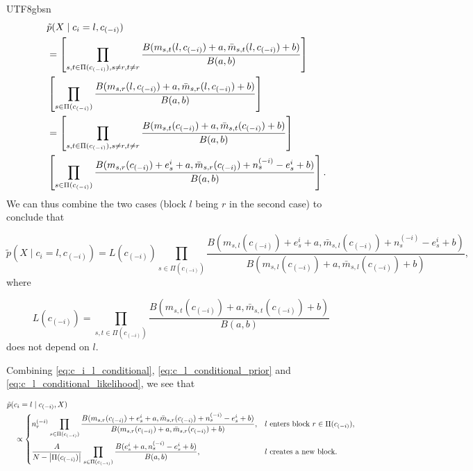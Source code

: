 \documentclass[12pt]{report}
\newcommand\tab[1][1cm]{\hspace*{#1}}
\newcommand{\squared}[1]{\left [ #1 \right ]}
\theoremstyle{plain}
\theoremstyle{definition}
\begin{document}
\begin{CJK*}{UTF8}{gbsn}
\begin{equation*}
  \begin{split}
  \tab[0.4cm] & \tilde{p}(X \mid c_i = l,c_{(-i)}) \\ & = 
  \squared{\prod_{s, t \in \Pi(c_{(-i)}), s \neq r, t \neq r} 
  \frac{B(m_{s,t}(l,c_{(-i)})+a, \bar{m}_{s,t}(l,c_{(-i)})+b)}{B(a,b)}}
  \\ & \squared{\prod_{s \in \Pi(c_{(-i)})}
  \frac{B(m_{s,r}(l, c_{(-i)})+a, \bar{m}_{s,r}(l, c_{(-i)})+b)}{B(a,b)}}
  \\ & =
  \squared{\prod_{s, t \in \Pi(c_{(-i)}), s \neq r, t \neq r} 
  \frac{B(m_{s,t}(c_{(-i)})+a, \bar{m}_{s,t}(c_{(-i)})+b)}{B(a,b)}}
  \\ & \squared{\prod_{s \in \Pi(c_{(-i)})} 
  \frac{B(m_{s,r}(c_{(-i)})+e^i_s+a, \bar{m}_{s,r}(c_{(-i)})+n_s^{(-i)} - e^i_s+b)}{B(a,b)}}.
  \end{split}
\end{equation*}
We can thus combine the two cases (block $l$ being $r$ in the second case) to conclude that

\begin{equation}\label{eq:c_l_conditional_likelihood}
  \tilde{p}(X \mid c_i = l,c_{(-i)}) = L(c_{(-i)})
  \prod_{s \in \Pi(c_{(-i)})}
  \frac{B(m_{s,l}(c_{(-i)})+e^i_s+a, \bar{m}_{s,l}(c_{(-i)})+n_s^{(-i)} - e^i_s+b)}{B(m_{s,l}(c_{(-i)})+a, \bar{m}_{s,l}(c_{(-i)})+b)},
\end{equation}
where 

\begin{equation*}
  L(c_{(-i)}) = \prod_{s, t \in \Pi(c_{(-i)})}
  \frac{B(m_{s,t}(c_{(-i)})+a, \bar{m}_{s,t}(c_{(-i)})+b)}{B(a,b)}
\end{equation*}
does not depend on $l$.

Combining \eqref{eq:c_i_l_conditional}, \eqref{eq:c_l_conditional_prior} and \eqref{eq:c_l_conditional_likelihood},
we see that 

\begin{equation*}
  \begin{split}
  & \tilde{p}(c_i = l \mid c_{(-i)}, X) \\
  & \quad \propto
  \begin{cases}
    \displaystyle n_r^{(-i)} \prod_{s \in \Pi(c_{(-i)})}
    \frac{B(m_{s,r}(c_{(-i)})+e^i_s+a, \bar{m}_{s,r}(c_{(-i)})+n_s^{(-i)} - e^i_s+b)}{B(m_{s,r}(c_{(-i)})+a, \bar{m}_{s,r}(c_{(-i)})+b)},
    & \text{$l$ enters block $r \in \Pi(c_{(-i)})$}, \\[1.5em]
    \displaystyle \frac{A}{N - \abs{\Pi(c_{(-i)})}} \prod_{s \in \Pi(c_{(-i)})}
    \frac{B(e^i_s+a, n_s^{(-i)} - e^i_s+b)}{B(a,b)},
    & \text{$l$ creates a new block}.
  \end{cases}
  \end{split}
\end{equation*}


\end{CJK*}
\end{document}
